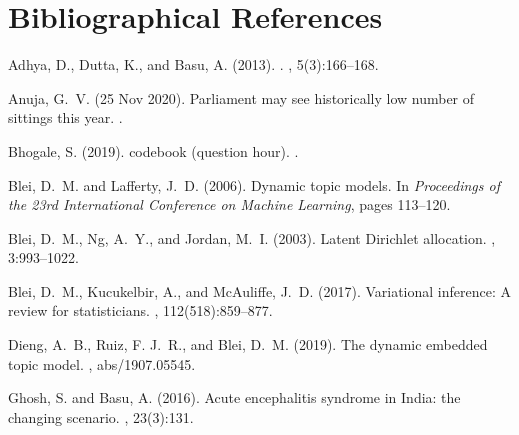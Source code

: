 \documentclass[10pt, a4paper]{article}
\begin{document}
\section{Bibliographical References}\label{reference}
\begin{thebibliography}{}

Adhya, D., Dutta, K., and Basu, A.
\newblock (2013).
.
, 5(3):166--168.

Anuja, G.~V.
\newblock (25 Nov 2020).
\newblock Parliament may see historically low number of sittings this year.
.

Bhogale, S.
\newblock (2019).
 codebook (question hour).
.

Blei, D.~M. and Lafferty, J.~D.
\newblock (2006).
\newblock Dynamic topic models.
\newblock In {\em Proceedings of the 23rd International Conference on Machine
  Learning}, pages 113--120.

Blei, D.~M., Ng, A.~Y., and Jordan, M.~I.
\newblock (2003).
\newblock Latent {Dirichlet} allocation.
, 3:993--1022.

Blei, D.~M., Kucukelbir, A., and McAuliffe, J.~D.
\newblock (2017).
\newblock Variational inference: A review for statisticians.
,
  112(518):859--877.

Dieng, A.~B., Ruiz, F. J.~R., and Blei, D.~M.
\newblock (2019).
\newblock The dynamic embedded topic model.
, abs/1907.05545.

Ghosh, S. and Basu, A.
\newblock (2016).
\newblock Acute encephalitis syndrome in {India}: the changing scenario.
, 23(3):131.


\end{thebibliography}
\end{document}
